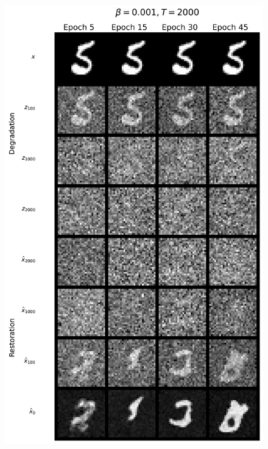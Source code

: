 \documentclass[11pt]{article}
\begin{document}
\begin{figure}[H]
    \centering
    \begin{minipage}{0.48\textwidth}
        \includegraphics[width=\linewidth]{figs/q1b_good_cond_samples.png}
        \label{fig:train_cond_left_img}
    \end{minipage}\hfill
    \begin{minipage}{0.48\textwidth}

\end{minipage}
\end{figure}
\end{document}
